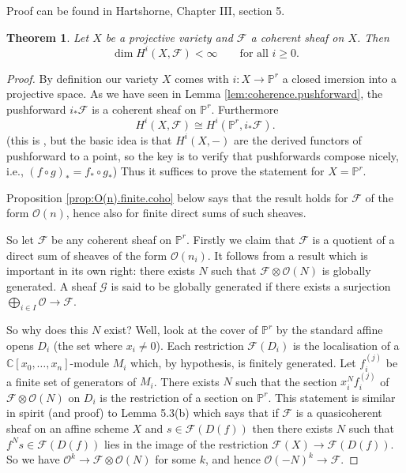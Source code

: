 \documentclass[12pt]{article}
\theoremstyle{plain}
\newtheorem{thm}{Theorem}[section]
\theoremstyle{definition}
\numberwithin{equation}{section}
\newcommand{\C}{\mathbb{C}}
\newcommand{\bbP}{\mathbb{P}}
\newcommand{\CF}{\mathcal{F}}
\newcommand{\CG}{\mathcal{G}}
\newcommand{\OO}{\mathcal{O}}
\begin{document}
Proof can be found in Hartshorne, Chapter III, section 5.
\begin{thm}
Let $X$ be a projective variety and $\CF$ a coherent sheaf on $X$. Then
\[
\dim H^i(X, \CF) < \infty \qquad \text{for all $i \geq 0$}.
\]

\end{thm}

\begin{proof}
By definition our variety $X$ comes with $i : X \rightarrow \bbP^r$ a closed imersion into a projective space. As we have seen in Lemma \ref{lem:coherence.pushforward}, the pushforward $i_* \CF$ is a coherent sheaf on $\bbP^r$. Furthermore
\[
H^i(X, \CF) \cong H^i(\bbP^r, i_*\CF).
\]
 (this is {\cite[III, Lemma 2.10]{Hartshorne}}, but the basic idea is that $H^i(X, -)$ are the derived functors of pushforward to a point, so the key is to verify that pushforwards compose nicely, i.e., $(f \circ g)_* = f_* \circ g_*$)
Thus it suffices to prove the statement for $X = \bbP^r$.

Proposition \ref{prop:O(n).finite.coho} below says that the result holds for $\CF$ of the form $\OO(n)$, hence also for finite direct sums of such sheaves.

So let $\CF$ be any coherent sheaf on $\bbP^r$. Firstly we claim that $\CF$ is a quotient of a direct sum of sheaves of the form $\OO(n_i)$. It follows from a result which is important in its own right: there exists $N$ such that $\CF \otimes \OO(N)$ is globally generated. A sheaf $\CG$ is said to be globally generated if there exists a surjection $\bigoplus_{i \in I} \OO \rightarrow \CF$.

So why does this $N$ exist? Well, look at the cover of $\bbP^r$ by the standard affine opens $D_i$ (the set where $x_i \neq 0$). Each restriction $\CF(D_i)$ is the localisation of a $\C[x_0, \ldots, x_n]$-module $M_i$ which, by hypothesis, is finitely generated. Let $f_i^{(j)}$ be a finite set of generators of $M_i$. There exists $N$ such that the section $x_i^N f_i^{(j)}$ of $\CF \otimes \OO(N)$ on $D_i$ is the restriction of a section on $\bbP^r$. This statement is similar in spirit (and proof) to Lemma 5.3(b) which says that if $\CF$ is a quasicoherent sheaf on an affine scheme $X$ and $s \in \CF(D(f))$ then there exists $N$ such that $f^N s \in \CF(D(f))$ lies in the image of the restriction $\CF(X) \rightarrow \CF(D(f))$. So we have $\OO^k \rightarrow \CF \otimes \OO(N)$ for some $k$, and hence $\OO(-N)^k \rightarrow \CF$.



\end{proof}
\end{document}
